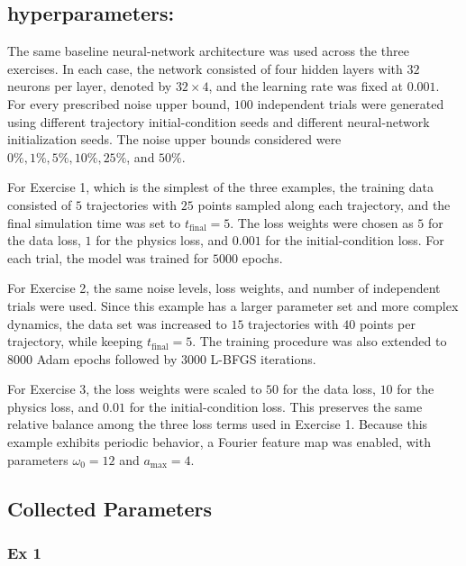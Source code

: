 \documentclass[11pt]{article}
\begin{document}
\subsection{hyperparameters:}

The same baseline neural-network architecture was used across the three exercises. In each case, the network consisted of four hidden layers with \(32\) neurons per layer, denoted by \(32\times 4\), and the learning rate was fixed at \(0.001\). For every prescribed noise upper bound, \(100\) independent trials were generated using different trajectory initial-condition seeds and different neural-network initialization seeds. The noise upper bounds considered were \(0\%,1\%,5\%,10\%,25\%\), and \(50\%\).

For Exercise 1, which is the simplest of the three examples, the training data consisted of \(5\) trajectories with \(25\) points sampled along each trajectory, and the final simulation time was set to \(t_{\mathrm{final}}=5\). The loss weights were chosen as \(5\) for the data loss, \(1\) for the physics loss, and \(0.001\) for the initial-condition loss. For each trial, the model was trained for \(5000\) epochs.

For Exercise 2, the same noise levels, loss weights, and number of independent trials were used. Since this example has a larger parameter set and more complex dynamics, the data set was increased to \(15\) trajectories with \(40\) points per trajectory, while keeping \(t_{\mathrm{final}}=5\). The training procedure was also extended to \(8000\) Adam epochs followed by \(3000\) L-BFGS iterations.

For Exercise 3, the loss weights were scaled to \(50\) for the data loss, \(10\) for the physics loss, and \(0.01\) for the initial-condition loss. This preserves the same relative balance among the three loss terms used in Exercise 1. Because this example exhibits periodic behavior, a Fourier feature map was enabled, with parameters \(\omega_0=12\) and \(a_{\max}=4\).


\subsection{Collected Parameters}



\subsubsection{Ex 1}
\end{document}

